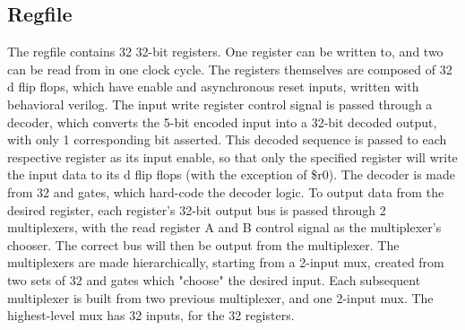 \documentclass[letterpaper]{article} %
\begin{document}
\subsection*{Regfile}
The regfile contains 32 32-bit registers. One register can be written to, and two can be read from in one clock cycle. The registers themselves are composed of 32 d flip flops, which have enable and asynchronous reset inputs, written with behavioral verilog. The input write register control signal is passed through a decoder, which converts the 5-bit encoded input into a 32-bit decoded output, with only 1 corresponding bit asserted. This decoded sequence is passed to each respective register as its input enable, so that only the specified register will write the input data to its d flip flops (with the exception of \$r0). The decoder is made from 32 and gates, which hard-code the decoder logic. To output data from the desired register, each register's 32-bit output bus is passed through 2 multiplexers, with the read register A and B control signal as the multiplexer's chooser. The correct bus will then be output from the multiplexer. The multiplexers are made hierarchically, starting from a 2-input mux, created from two sets of 32 and gates which "choose" the desired input. Each subsequent multiplexer is built from two previous multiplexer, and one 2-input mux. The highest-level mux has 32 inputs, for the 32 registers. \\
\end{document}
